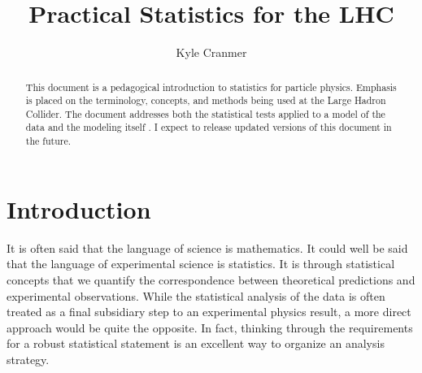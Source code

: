 \documentclass{cernrep}
\begin{document}
\title{Practical Statistics for the LHC}
 
\author{Kyle Cranmer}


\maketitle %


\begin{abstract}
This document is a pedagogical introduction to statistics for particle physics.  
Emphasis is placed on the terminology, concepts, and methods being used at the Large Hadron Collider.  
The document addresses both the statistical tests applied to a model of the data and the modeling itself .
I expect to release updated versions of this document in the future.
\end{abstract}

 \nopagebreak
\tableofcontents\nopagebreak

\newpage

\section{Introduction}

It is often said that the language of science is mathematics.  It could well be said that the language of experimental science is statistics.  It is through statistical concepts that we quantify the correspondence between theoretical predictions and experimental observations.  While the statistical analysis of the data is often treated as a final subsidiary step to an experimental physics result, a more direct approach would be quite the opposite.  In fact, thinking through the requirements for a robust statistical statement is an excellent way to organize an analysis strategy.  
\end{document}
